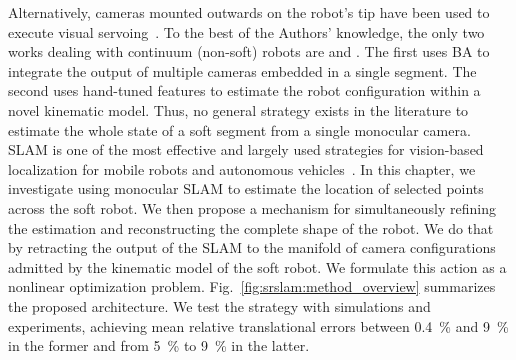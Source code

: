 %
%
%
%
%
%
%
Alternatively, cameras mounted outwards on the robot's tip have been used to execute visual servoing~\citep{homberg2019robust, wang2013visual}.
%
To the best of the Authors' knowledge, the only two works dealing with continuum (non-soft) robots are \citep{weber2012multi} and \citep{cheng2020approximate}.
% 
The first uses \gls{BA} to integrate the output of multiple cameras embedded in a single segment. The second uses hand-tuned features to estimate the robot configuration within a novel kinematic model. Thus, no general strategy exists in the literature to estimate the whole state of a soft segment from a single monocular camera.
%
\gls{SLAM} is one of the most effective and largely used strategies for vision-based localization for mobile robots and autonomous vehicles~\citep{fuentes2015visual,mur2017orb}. %
%
In this chapter, we investigate using monocular \gls{SLAM} to estimate the location of selected points across the soft robot. We then propose a mechanism for simultaneously refining the estimation and reconstructing the complete shape of the robot. We do that by retracting the output of the \gls{SLAM} to the manifold of camera configurations admitted by the kinematic model of the soft robot. We formulate this action as a nonlinear optimization problem. Fig.~\ref{fig:srslam:method_overview} summarizes the proposed architecture. We test the strategy with simulations and experiments, achieving mean relative translational errors between \SI{0.4}{\percent} and \SI{9}{\percent} in the former and from \SI{5}{\percent} to \SI{9}{\percent} in the latter.

